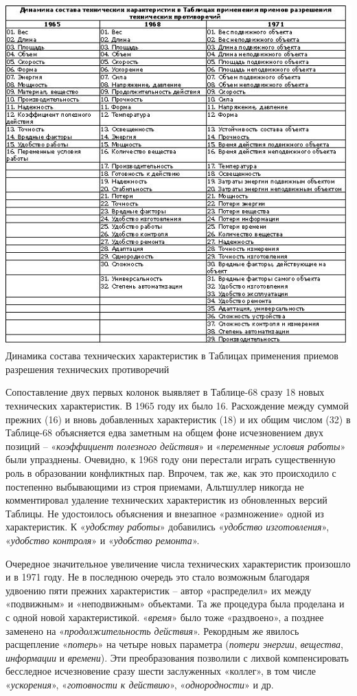 \documentclass[11pt,a4paper]{article}
\begin{document}
\begin{center}
  \includegraphics[width=.8\textwidth]{./19.jpg} \\
Динамика состава технических характеристик в Таблицах применения приемов
разрешения технических противоречий 
\end{center}

Сопоставление двух первых колонок выявляет в Таблице-68 сразу 18 новых
технических характеристик. В 1965 году их было 16. Расхождение между суммой
прежних (16) и вновь добавленных характеристик (18) и их общим числом (32) в
Таблице-68 объясняется едва заметным на общем фоне исчезновением двух позиций
-- «\emph{коэффициент полезного действия}» и «\emph{переменные условия
  работы}» были упразднены. Очевидно, к 1968 году они перестали играть
существенную роль в образовании конфликтных пар. Впрочем, так же, как это
происходило с постепенно выбывающими из строя приемами, Альтшуллер никогда не
комментировал удаление технических характеристик из обновленных версий
Таблицы.  Не удостоилось объяснения и внезапное «размножение» одной из
характеристик. К «\emph{удобству работы}» добавились «\emph{удобство
  изготовления}», «\emph{удобство контроля}» и «\emph{удобство ремонта}».

Очередное значительное увеличение числа технических характеристик произошло и
в 1971 году. Не в последнюю очередь это стало возможным благодаря удвоению
пяти прежних характеристик -- автор «распределил» их между «подвижным» и
«неподвижным» объектами. Та же процедура была проделана и с одной новой
характеристикой. «\emph{время}» было тоже «раздвоено», а позднее заменено на
«\emph{продолжительность действия}». Рекордным же явилось расщепление
«\emph{потерь}» на четыре новых параметра (\emph{потери энергии},
\emph{вещества}, \emph{информации} и \emph{времени}). Эти преобразования
позволили с лихвой компенсировать бесследное исчезновение сразу шести
заслуженных «коллег», в том числе «\emph{ускорения}», «\emph{готовности к
  действию}», «\emph{однородности}» и др.
\end{document}

